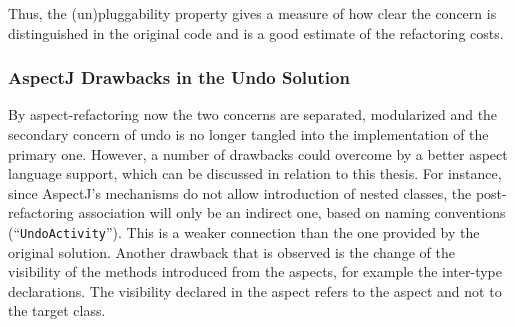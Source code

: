Thus, the (un)pluggability property gives a measure of how clear the concern is distinguished in the original code and is a good estimate of the refactoring costs.

\subsubsection{AspectJ Drawbacks in the Undo Solution}
By aspect-refactoring now the two concerns are separated, modularized and the secondary concern of undo is no longer tangled into the implementation of the primary one. 
However, a number of drawbacks could overcome by a better aspect language support, which can be discussed in relation to this thesis. 
For instance, since AspectJ's mechanisms do not allow introduction of nested classes, the post-refactoring association will only be an indirect one, based on naming conventions (``\texttt{UndoActivity}''). 
This is a weaker connection than the one provided by the original solution. 
Another drawback that is observed is the change of the visibility of the methods introduced from the aspects, for example the inter-type declarations. 
The visibility declared in the aspect refers to the aspect and not to the target class. 


